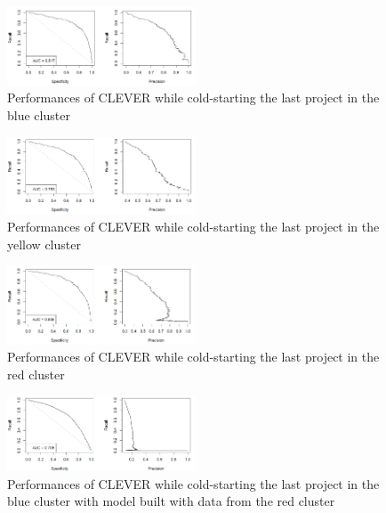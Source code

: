 \begin{figure}
  \centering
    \includegraphics[width=0.5\textwidth]{media/bluecluster.png}
    \caption{Performances of CLEVER while cold-starting the last project in the blue cluster\label{fig:bluecluster}}
\end{figure}

\begin{figure}
  \centering
    \includegraphics[width=0.5\textwidth]{media/yellowcluster.png}
    \caption{Performances of CLEVER while cold-starting the last project in the yellow cluster\label{fig:yellowcluster}}
\end{figure}


\begin{figure}
  \centering
    \includegraphics[width=0.5\textwidth]{media/redcluster.png}
    \caption{Performances of CLEVER while cold-starting the last project in the red cluster\label{fig:redcluster}}
\end{figure}

\begin{figure}
  \centering
    \includegraphics[width=0.5\textwidth]{media/redonblue.png}
    \caption{Performances of CLEVER while cold-starting the last project in the blue cluster with model built with data from the red cluster\label{fig:redonblue}}
\end{figure}